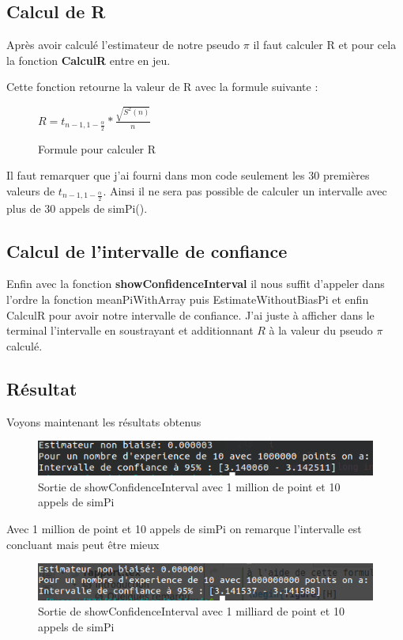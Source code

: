 \documentclass[12pt,french]{article} %
\begin{document}
\subsection{Calcul de R}

Après avoir calculé l'estimateur de notre pseudo $\pi$ il faut calculer R et pour cela la fonction \textbf{CalculR} entre en jeu.

Cette fonction retourne la valeur de R avec la formule suivante :

\begin{figure}[H]
	\centering
		$R = t_{n-1, 1-\frac{\alpha}{2}} * \frac{\sqrt{S^{2}(n)}}{n}$
	\caption{Formule pour calculer R} 
\end{figure}

Il faut remarquer que j'ai fourni dans mon code seulement les 30 premières valeurs de $t_{n-1, 1-\frac{\alpha}{2}}$. Ainsi il ne sera pas possible de calculer un intervalle avec plus de 30 appels de simPi().

\subsection{Calcul de l'intervalle de confiance}

Enfin avec la fonction \textbf{showConfidenceInterval} il nous suffit d'appeler dans l'ordre la fonction meanPiWithArray puis EstimateWithoutBiasPi et enfin CalculR pour avoir notre intervalle de confiance. J'ai juste à afficher dans le terminal l'intervalle en soustrayant et additionnant $R$ à la valeur du pseudo $\pi$ calculé.

\subsection{Résultat}

Voyons maintenant les résultats obtenus

\begin{figure}[H]
	\centering
	\includegraphics[scale=0.6]{exo3-0.png}
	\caption{Sortie de showConfidenceInterval avec 1 million de point et 10 appels de simPi}
\end{figure}

Avec 1 million de point et 10 appels de simPi on remarque l'intervalle est concluant mais peut être mieux

\begin{figure}[H]
	\centering
	\includegraphics[scale=0.6]{exo3-1.png}
	\caption{Sortie de showConfidenceInterval avec 1 milliard de point et 10 appels de simPi}
\end{figure}
\end{document}
